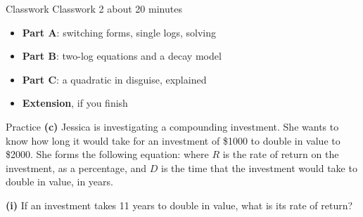 \documentclass[aspectratio=169,11pt,xcolor=table,t]{beamer}
\begin{document}
\begin{frame}{Classwork}
\relax
Classwork 2 \textperiodcentered{} about 20 minutes
\begin{itemize}
\item \textbf{Part A}: switching forms, single logs, solving
\item \textbf{Part B}: two-log equations and a decay model
\item \textbf{Part C}: a quadratic in disguise, explained
\item \textbf{Extension}, if you finish
\end{itemize}
\end{frame}

\begin{frame}{Practice}
\relax
\textbf{(c)} Jessica is investigating a compounding investment. She wants to know how long it would take for an investment of \$1000 to double in value to \$2000. She forms the following equation:
where $R$ is the rate of return on the investment, as a percentage, and $D$ is the time that the investment would take to double in value, in years.\par\smallskip
\textbf{(i)} If an investment takes 11 years to double in value, what is its rate of return?
\end{frame}
\end{document}
